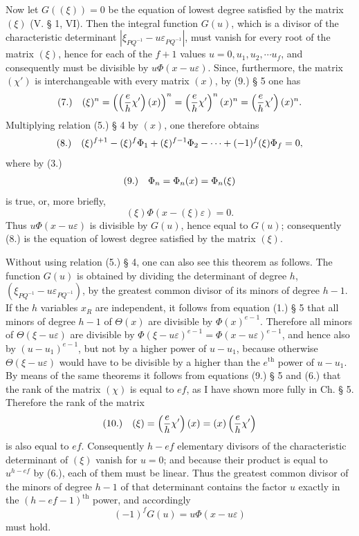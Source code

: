 \documentclass[11pt]{article}
\makeatletter
\newcommand{\frobtag}[2]{\[\begin{array}{@{}r@{\quad}l@{}}\textup{(#1)} & \displaystyle #2\end{array}\]}
\newcommand{\frobtagc}[2]{\[\begin{array}{@{}r@{\quad}c@{}}\textup{(#1)} & \displaystyle #2\end{array}\]}
\makeatother
\begin{document}
Now let $G((\xi))=0$ be the equation of lowest degree satisfied by the matrix $(\xi)$ (V. § 1, VI). Then the integral function $G(u)$, which is a divisor of the characteristic determinant $\left|\xi_{PQ^{-1}}-u\varepsilon_{PQ^{-1}}\right|$, must vanish for every root of the matrix $(\xi)$, hence for each of the $f+1$ values $u=0,u_1,u_2,\cdots u_f$, and consequently must be divisible by $u\Phi(x-u\varepsilon)$. Since, furthermore, the matrix $(\chi')$ is interchangeable with every matrix $(x)$, by (9.) § 5 one has
\frobtag{7.}{(\xi)^n=\left(\left(\frac{e}{h}\chi'\right)(x)\right)^n=\left(\frac{e}{h}\chi'\right)^n(x)^n=\left(\frac{e}{h}\chi'\right)(x)^n.}
Multiplying relation (5.) § 4 by $(x)$, one therefore obtains
\frobtag{8.}{(\xi)^{f+1}-(\xi)^f\Phi_1+(\xi)^{f-1}\Phi_2-\cdots+(-1)^f(\xi)\Phi_f=0,}
where by (3.)
\frobtagc{9.}{\Phi_n=\Phi_n(x)=\Phi_n(\xi)}
is true, or, more briefly,
\[
(\xi)\Phi(x-(\xi)\varepsilon)=0.
\]
Thus $u\Phi(x-u\varepsilon)$ is divisible by $G(u)$, hence equal to $G(u)$; consequently (8.) is the equation of lowest degree satisfied by the matrix $(\xi)$.

Without using relation (5.) § 4, one can also see this theorem as follows. The function $G(u)$ is obtained by dividing the determinant of degree $h$, $(\xi_{PQ^{-1}}-u\varepsilon_{PQ^{-1}})$, by the greatest common divisor of its minors of degree $h-1$. If the $h$ variables $x_R$ are independent, it follows from equation (1.) § 5 that all minors of degree $h-1$ of $\Theta(x)$ are divisible by $\Phi(x)^{e-1}$. Therefore all minors of $\Theta(\xi-u\varepsilon)$ are divisible by $\Phi(\xi-u\varepsilon)^{e-1}=\Phi(x-u\varepsilon)^{e-1}$, and hence also by $(u-u_1)^{e-1}$, but not by a higher power of $u-u_1$, because otherwise $\Theta(\xi-u\varepsilon)$ would have to be divisible by a higher than the $e^{\mathrm{th}}$ power of $u-u_1$. By means of the same theorems it follows from equations (9.) § 5 and (6.) that the rank of the matrix $(\chi)$ is equal to $ef$, as I have shown more fully in Ch. § 5. Therefore the rank of the matrix
\frobtagc{10.}{(\xi)=\left(\frac{e}{h}\chi'\right)(x)=(x)\left(\frac{e}{h}\chi'\right)}
is also equal to $ef$. Consequently $h-ef$ elementary divisors of the characteristic determinant of $(\xi)$ vanish for $u=0$; and because their product is equal to $u^{h-ef}$ by (6.), each of them must be linear. Thus the greatest common divisor of the minors of degree $h-1$ of that determinant contains the factor $u$ exactly in the $(h-ef-1)^{\mathrm{th}}$ power, and accordingly
\[
(-1)^fG(u)=u\Phi(x-u\varepsilon)
\]
must hold.
\end{document}

